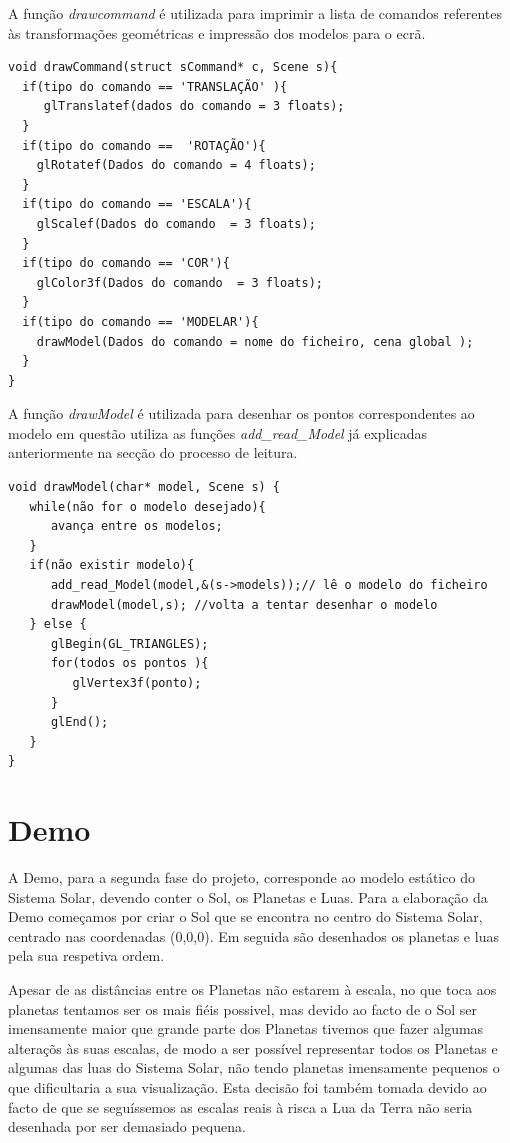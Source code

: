 A função \textit{drawcommand} é utilizada para imprimir a lista de comandos referentes às transformações geométricas e impressão  dos modelos para o ecrã. 

\begin{Verbatim}
void drawCommand(struct sCommand* c, Scene s){
  if(tipo do comando == 'TRANSLAÇÃO' ){
     glTranslatef(dados do comando = 3 floats);
  }
  if(tipo do comando ==  'ROTAÇÃO'){
    glRotatef(Dados do comando = 4 floats);
  }
  if(tipo do comando == 'ESCALA'){
    glScalef(Dados do comando  = 3 floats);
  }
  if(tipo do comando == 'COR'){
    glColor3f(Dados do comando  = 3 floats);
  }
  if(tipo do comando == 'MODELAR'){
    drawModel(Dados do comando = nome do ficheiro, cena global );
  }
}

\end{Verbatim}


A função \textit{drawModel} é utilizada para desenhar os pontos correspondentes ao modelo em questão utiliza as funções \textit{add\_read\_Model} já explicadas anteriormente na secção do processo de leitura. 
\begin{Verbatim}
void drawModel(char* model, Scene s) {
   while(não for o modelo desejado){
      avança entre os modelos; 
   }
   if(não existir modelo){
      add_read_Model(model,&(s->models));// lê o modelo do ficheiro
      drawModel(model,s); //volta a tentar desenhar o modelo
   } else {
      glBegin(GL_TRIANGLES);
      for(todos os pontos ){
         glVertex3f(ponto);
      }
      glEnd();
   }
}
\end{Verbatim}


\chapter{Demo}

A Demo, para a segunda fase do projeto, corresponde ao modelo estático do Sistema Solar, devendo conter o Sol, os Planetas e Luas. Para a elaboração da Demo começamos por criar o Sol que se encontra no centro do Sistema Solar, centrado nas coordenadas (0,0,0). Em seguida são desenhados os planetas  e luas pela sua respetiva ordem.

Apesar de as distâncias entre os Planetas não estarem à escala, no que toca aos planetas tentamos ser os mais fiéis possivel, mas devido ao facto de o Sol ser imensamente maior que grande parte dos Planetas tivemos que fazer algumas alteraçõs às suas escalas, de modo a ser possível representar todos os Planetas e algumas das luas do Sistema Solar, não tendo planetas imensamente pequenos o que dificultaria a sua visualização. Esta decisão foi também tomada devido ao facto de que se seguíssemos as escalas reais à risca a Lua da Terra não seria desenhada por ser demasiado pequena.

